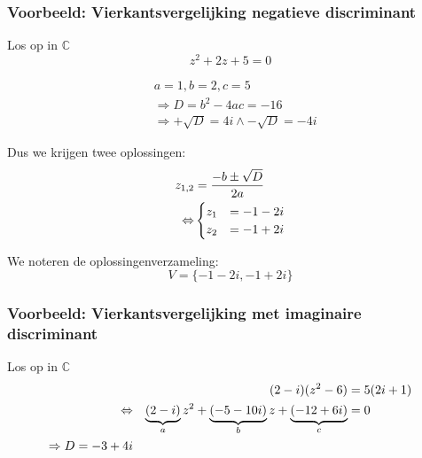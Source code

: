 \documentclass[12pt,twoside,a4]{article}
\begin{document}
\subsubsection*{Voorbeeld: Vierkantsvergelijking negatieve discriminant}

Los op in $\mathbb{C}$
$$z^2 + 2z + 5 = 0$$

\begin{align*}
  & a=1, b=2, c=5\\
  & \Rightarrow  D = b^2 - 4ac = -16\\
  & \Rightarrow  +\sqrt{D} = 4i \wedge -\sqrt{D}=-4i
\end{align*}

Dus we krijgen twee oplossingen:
\begin{align*}
  z_{1,2} &= \dfrac{-b \pm \sqrt{D}}{2a}\\
  \Leftrightarrow & \begin{cases}z_1 &= -1 - 2i\\z_2 &= -1 + 2i\end{cases}
\end{align*}

We noteren de oplossingenverzameling:
$$V=\{ -1-2i, -1+2i \}$$

\subsubsection*{Voorbeeld: Vierkantsvergelijking met imaginaire discriminant}

Los op in $\mathbb{C}$
\begin{align*}
       && (2-i)(z^2-6) &= 5(2i+1)\\
  \Leftrightarrow && \underbrace{(2-i)}_a z^2 + \underbrace{(-5-10i)}_b z + \underbrace{(-12+6i)}_c &= 0\\
  \Rightarrow D = -3+4i
\end{align*}
\end{document}
